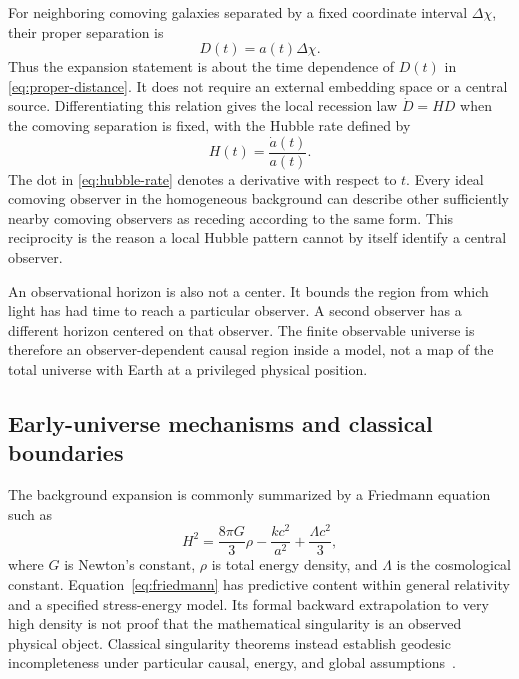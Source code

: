 \documentclass[10pt,conference]{IEEEtran}
\begin{document}
For neighboring comoving galaxies separated by a fixed coordinate interval $\Delta\chi$, their proper separation is
\begin{equation}
D(t)=a(t)\Delta\chi.
\label{eq:proper-distance}
\end{equation}
Thus the expansion statement is about the time dependence of $D(t)$ in \eqref{eq:proper-distance}. It does not require an external embedding space or a central source. Differentiating this relation gives the local recession law $\dot{D}=H D$ when the comoving separation is fixed, with the Hubble rate defined by
\begin{equation}
H(t)=\frac{\dot{a}(t)}{a(t)}.
\label{eq:hubble-rate}
\end{equation}
The dot in \eqref{eq:hubble-rate} denotes a derivative with respect to $t$. Every ideal comoving observer in the homogeneous background can describe other sufficiently nearby comoving observers as receding according to the same form. This reciprocity is the reason a local Hubble pattern cannot by itself identify a central observer.

An observational horizon is also not a center. It bounds the region from which light has had time to reach a particular observer. A second observer has a different horizon centered on that observer. The finite observable universe is therefore an observer-dependent causal region inside a model, not a map of the total universe with Earth at a privileged physical position.

\subsection{Early-universe mechanisms and classical boundaries}

The background expansion is commonly summarized by a Friedmann equation such as
\begin{equation}
H^2=\frac{8\pi G}{3}\rho-\frac{k c^2}{a^2}+\frac{\Lambda c^2}{3},
\label{eq:friedmann}
\end{equation}
where $G$ is Newton's constant, $\rho$ is total energy density, and $\Lambda$ is the cosmological constant. Equation~\eqref{eq:friedmann} has predictive content within general relativity and a specified stress-energy model. Its formal backward extrapolation to very high density is not proof that the mathematical singularity is an observed physical object. Classical singularity theorems instead establish geodesic incompleteness under particular causal, energy, and global assumptions~\cite{hawkingpenrose1970}.
\end{document}
